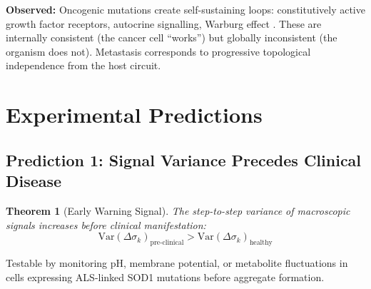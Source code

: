 \documentclass[10pt,twocolumn,a4paper]{article}
\theoremstyle{plain}
\newtheorem{theorem}{Theorem}[section]
\theoremstyle{definition}
\theoremstyle{remark}
\newcommand{\sig}{\sigma}
\begin{document}
\textbf{Observed:} Oncogenic mutations create self-sustaining loops: constitutively active growth factor receptors, autocrine signalling, Warburg effect \citep{hanahan2011}. These are internally consistent (the cancer cell ``works'') but globally inconsistent (the organism does not). Metastasis corresponds to progressive topological independence from the host circuit.


\section{Experimental Predictions}
\label{sec:predictions}

\subsection{Prediction 1: Signal Variance Precedes Clinical Disease}

\begin{theorem}[Early Warning Signal]
\label{thm:early_warning}
The step-to-step variance of macroscopic signals increases before clinical manifestation:
\begin{equation}
    \mathrm{Var}(\Delta\sig_k)_{\mathrm{pre\text{-}clinical}} > \mathrm{Var}(\Delta\sig_k)_{\mathrm{healthy}}
\end{equation}
\end{theorem}

Testable by monitoring pH, membrane potential, or metabolite fluctuations in cells expressing ALS-linked SOD1 mutations before aggregate formation.
\end{document}
